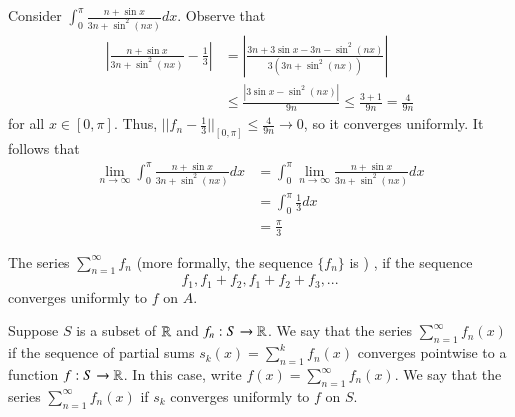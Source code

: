 \begin{example}
    Consider $\int_0^{\pi}\frac{n+\sin x}{3n+\sin^2(nx)}dx$. Observe that \begin{align*}
        \left|\frac{n+\sin x}{3n+\sin^2(nx)} - \frac{1}{3}\right| &= \left|\frac{3n+3\sin x-3n-\sin^2(nx)}{3(3n+\sin^2(nx))}\right| \\
        &\leq \frac{|3\sin x - \sin^2(nx)|}{9n} \leq \frac{3+1}{9n} = \frac{4}{9n}
    \end{align*}
    for all $x \in [0,\pi]$. Thus, $||f_n-\frac{1}{3}||_{[0,\pi]} \leq \frac{4}{9n}\rightarrow 0$, so it converges uniformly. It follows that \begin{align*}
        \lim\limits_{n\rightarrow \infty}\int_0^{\pi}\frac{n+\sin x}{3n+\sin^2(nx)}dx &= \int_0^{\pi}\lim\limits_{n\rightarrow \infty}\frac{n+\sin x}{3n+\sin^2(nx)}dx \\
        &= \int_0^{\pi}\frac{1}{3}dx \\
        &= \frac{\pi}{3}
    \end{align*}
\end{example}

\begin{definition}
    The series $\sum\limits_{n=1}^{\infty}f_n$  (more formally, the sequence $\{f_n\}$ is ) , if the sequence \begin{equation*}
        f_1, f_1+f_2,f_1+f_2+f_3,...
    \end{equation*}
    converges uniformly to $f$ on $A$.
\end{definition}

\begin{definition}
    Suppose $S$ is a subset of $\mathbb R$ and $f_n:S\rightarrow \mathbb R$. We say that the series $\sum_{n=1}^{\infty}f_n(x)$  if the sequence of partial sums $s_k(x) = \sum_{n=1}^kf_n(x)$ converges pointwise to a function $f:S\rightarrow \mathbb R$. In this case, write $f(x) = \sum_{n=1}^{\infty}f_n(x)$. We say that the series $\sum_{n=1}^{\infty}f_n(x)$  if $s_k$ converges uniformly to $f$ on $S$.
\end{definition}



